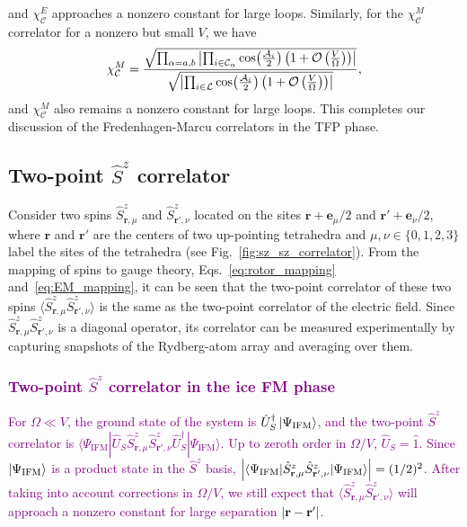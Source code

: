 \documentclass[twocolumn,superscriptaddress,amsmath,amssymb,aps,prx,nofootinbib]{revtex4-2}
\newcommand{\newtext}[1]{\textcolor{purple}{#1}}
\begin{document}
{and $\chi_\mathcal{C}^E$ approaches a nonzero constant for large loops. Similarly, for the $\chi_\mathcal{C}^M$ correlator for a nonzero  but small $V$, we have
\begin{equation}
    \chi_\mathcal{C}^M = \frac{\sqrt{\prod_{\alpha=a,b}\abs{\prod_{i \in \mathcal{C}_\alpha} \cos(\frac{\mathcal{A}_i}{2}) \left(1+ \mathcal{O} \left(\frac{V}{\Omega} \right) \right) }  }}{\sqrt{\abs{\prod_{i \in \mathcal{L}} \cos(\frac{\mathcal{A}_i}{2})\left(1+ \mathcal{O} \left(\frac{V}{\Omega} \right) \right) } }}, 
\end{equation}
and $\chi_\mathcal{C}^M$ also remains a nonzero constant for large loops. This completes our discussion of the Fredenhagen-Marcu correlators in the TFP phase.}\\

\subsection{Two-point $\hat{S}^z$ correlator} \label{sec:sz_sz_correlator}

Consider  two spins $\hat{S}^z_{\mathbf{r},\mu}$ and $\hat{S}^z_{\mathbf{r}',\nu}$ located on the sites $\mathbf{r} + \mathbf{e}_\mu/2$ and $\mathbf{r}' + \mathbf{e}_\nu/2$, where $\mathbf{r}$ and $\mathbf{r}'$ are the centers of two up-pointing tetrahedra and $\mu, \nu \in \{ 0,1,2,3 \}$ label the sites of the tetrahedra (see Fig.~\ref{fig:sz_sz_correlator}). From the mapping of spins to gauge theory, Eqs.~\eqref{eq:rotor_mapping} and~\eqref{eq:EM_mapping}, it can be seen that the two-point  correlator of these two spins $\langle \hat{S}^z_{\mathbf{r},\mu} \hat{S}^z_{\mathbf{r}',\nu}\rangle $ is the same as the two-point correlator of the electric field. Since $\hat{S}^z_{\mathbf{r},\mu} \hat{S}^z_{\mathbf{r'},\nu} $ is a diagonal operator, its correlator can be measured experimentally by capturing snapshots of the Rydberg-atom array and averaging over them.

\newtext{\subsubsection{Two-point $\hat{S}^z$ correlator in the ice FM phase}}
\label{sec:sz_sz_corr_ice_fm}

\newtext{
For $\Omega \ll V$, the ground state of the system is $\hat{U}_S^\dagger \ket{\Psi_\text{IFM}}$, and the two-point $\hat{S}^z$ correlator is $\langle \Psi_\text{IFM} | \hat{U}_S \hat{S}^z_{\mathbf{r},\mu} \hat{S}^z_{\mathbf{r}',\nu} \hat{U}_S^\dagger | \Psi_\text{IFM} \rangle $. 
Up to zeroth order in $\Omega/V$, $\hat{U}_S =\hat{1}$. 
Since $\ket{\Psi_\text{IFM}}$ is a  product state in the $\hat{S}^z$ basis, $\abs{\langle \Psi_\text{IFM} | \hat{S}^z_{\mathbf{r},\mu} \hat{S}^z_{\mathbf{r}',\nu} | \Psi_\text{IFM} \rangle } = (1/2)^2$. After taking into account corrections in $\Omega/V$, we still expect that $\langle \hat{S}^z_{\mathbf{r},\mu} \hat{S}^z_{\mathbf{r}',\nu}\rangle $ will approach a nonzero constant for large separation $\abs{ \mathbf{r} - \mathbf{r}'} $. }
\end{document}
